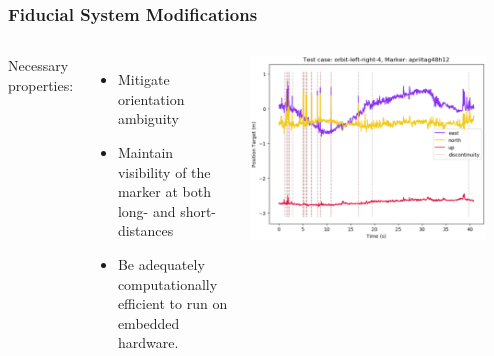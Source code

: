 \documentclass[aspectratio=169]{rubeamer}
\newcommand{\nologo}{\setbeamertemplate{logo}{}}
\begin{document}
\nologo
\begin{frame}
  \frametitle{Fiducial System Modifications}
  \begin{columns}

    Necessary properties:
    \begin{itemize}
      \item Mitigate orientation ambiguity
      \item Maintain visibility of the marker at both long- and short- distances
      \item Be adequately computationally efficient to run on embedded hardware.
    \end{itemize}
    \centering
    \includegraphics[width=0.9\textwidth]{orbit-left-right-4_apriltag48h12_position-target}
  \end{columns}
\end{frame}
\end{document}
